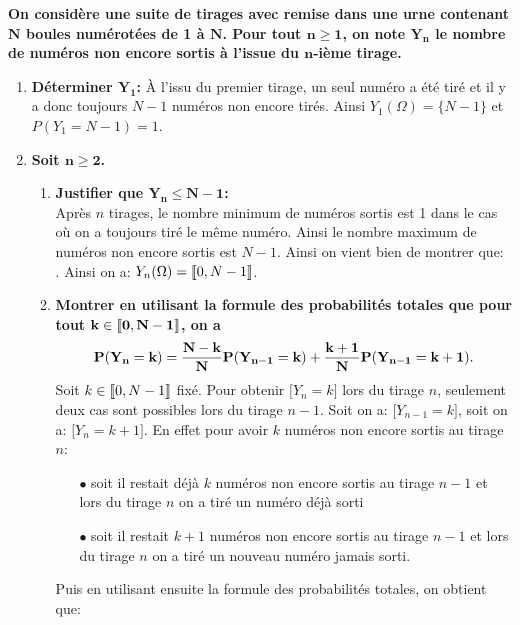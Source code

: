 \documentclass[a4paper, 11pt,reqno]{article}
\begin{document}
\begin{correction}  \;
	\noindent \textbf{On consid\`{e}re une suite de tirages \textbf{avec remise} dans une urne contenant $\mathbf{N}$ boules num\'erot\'ees de 1 \`{a} $\mathbf{N}$. Pour tout $\mathbf{n\geq 1}$, on note $\mathbf{Y_n}$ le nombre de num\'eros non encore sortis \`{a} l'issue du $\mathbf{n}$-i\`{e}me tirage.}
	\begin{enumerate}
		\item \textbf{D\'eterminer $\mathbf{Y_1}$:}
		      \`{A} l'issu du premier tirage, un seul num\'ero a \'et\'e tir\'e et il y a donc toujours $N-1$ num\'eros non encore tir\'es. Ainsi $Y_1(\Omega)=\lbrace N-1\rbrace$ et $P(Y_1=N-1)=1$. 
		\item \textbf{Soit $\mathbf{n\geq 2}$.}
		      \begin{enumerate}
			      \item \textbf{Justifier que $\mathbf{Y_n\leq N-1}$:}\\
			            \noindent Apr\`{e}s $n$ tirages, le nombre minimum de num\'eros sortis est 1 dans le cas o\`{u} on a toujours tir\'e le m\^{e}me num\'ero. Ainsi le nombre maximum de num\'eros non encore sortis est $N-1$. Ainsi on vient bien de montrer que: . Ainsi on a: $Y_n(\Omega)=\llbracket  0,N-1\rrbracket$.
			      \item \textbf{Montrer en utilisant la formule des probabilit\'es totales que pour tout $\mathbf{k\in\llbracket  0,N-1\rrbracket}$, on a}
			            $$\mathbf{P(Y_n=k)=\displaystyle\frac{N-k}{N}P(Y_{n-1}=k)+\displaystyle\frac{k+1}{N}P(Y_{n-1}=k+1).}$$
			            Soit $k\in \llbracket  0,N-1\rrbracket$ fix\'e. Pour obtenir $\lbrack Y_n=k\rbrack$ lors du tirage $n$, seulement deux cas sont possibles lors du tirage $n-1$. Soit on a: $\lbrack Y_{n-1}=k\rbrack$, soit on a: $\lbrack Y_n=k+1\rbrack$. En effet pour avoir $k$ num\'eros non encore sortis au tirage $n$:
			            \begin{itemize}
				            \item[$\bullet$] soit il restait d\'ej\`{a} $k$ num\'eros non encore sortis au tirage $n-1$ et lors du tirage $n$ on a tir\'e un num\'ero d\'ej\`{a} sorti
				            \item[$\bullet$] soit il restait $k+1$ num\'eros non encore sortis au tirage $n-1$ et lors du tirage $n$ on a tir\'e un nouveau num\'ero jamais sorti.
			            \end{itemize}
			            Puis en utilisant ensuite la formule des probabilit\'es totales, on obtient que:

\end{enumerate}
\end{enumerate}
\end{correction}
\end{document}
